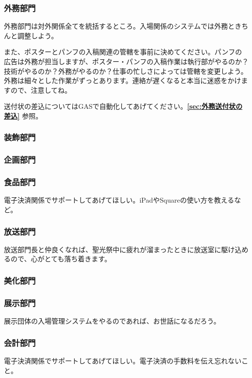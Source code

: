 \documentclass[dvipdfmx,jb5]{jarticle}
\begin{document}
\subsubsection{外務部門}
外務部門は対外関係全てを統括するところ。入場関係のシステムでは外務ときちんと調整しよう。

また、ポスターとパンフの入稿関連の管轄を事前に決めてください。パンフの広告は外務が担当しますが、ポスター・パンフの入稿作業は執行部がやるのか？技術がやるのか？外務がやるのか？仕事の忙しさによっては管轄を変更しよう。外務は細々とした作業がずっとあります。連絡が遅くなると本当に迷惑をかけますので、注意してね。

送付状の差込についてはGASで自動化してあげてください。{\bf \ref{sec:外務送付状の差込}} 参照。

\subsubsection{装飾部門}


\subsubsection{企画部門}


\subsubsection{食品部門}
電子決済関係でサポートしてあげてほしい。iPadやSquareの使い方を教えるなど。


\subsubsection{放送部門}
放送部門長と仲良くなれば、聖光祭中に疲れが溜まったときに放送室に駆け込めるので、心がとても落ち着きます。

\subsubsection{美化部門}


\subsubsection{展示部門}
展示団体の入場管理システムをやるのであれば、お世話になるだろう。

\subsubsection{会計部門}
電子決済関係でサポートしてあげてほしい。電子決済の手数料を伝え忘れないこと。
\end{document}
